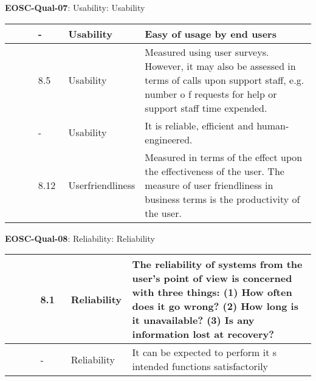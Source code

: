 \textbf{EOSC-Qual-07}: Usability: Usability
\nopagebreak[4]
\begin{center}
    \tabletail{\hline}
    \tiny
    \begin{supertabular}{|p{0.10\linewidth}|p{0.10\linewidth}|p{0.20\linewidth}|p{0.60\linewidth}|} \hline
        \cite{zuser_software_2005} & - & Usability & Easy of usage by end users\\ \hline
        \cite{gillies_modelling_1992} & 8.5 & Usability & Measured using user surveys. However, it may also be assessed in terms of calls upon support staff, e.g. number o f requests for help or support staff time expended.\\ \hline
        \cite{boehm_quantitative_1976} & - & Usability & It is reliable, efficient and human-engineered.\\ \hline
        \cite{gillies_modelling_1992} & 8.12 & Userfriendliness & Measured in terms of the effect upon the effectiveness of the user. The measure of user friendliness in business terms is the productivity of the user.\\ \hline
    \end{supertabular}
\end{center}

\textbf{EOSC-Qual-08}: Reliability: Reliability
\nopagebreak[4]
\begin{center}
    \tabletail{\hline}
    \tiny
    \begin{supertabular}{|p{0.10\linewidth}|p{0.10\linewidth}|p{0.20\linewidth}|p{0.60\linewidth}|} \hline
        \cite{gillies_modelling_1992} & 8.1 & Reliability & The reliability of systems from the user's point of view is concerned with three things: (1) How often does it go wrong? (2) How long is it unavailable? (3) Is any information lost at recovery?\\ \hline
        \cite{boehm_quantitative_1976} & - & Reliability & It can be expected to perform it s intended functions satisfactorily\\ \hline
    \end{supertabular}
\end{center}

